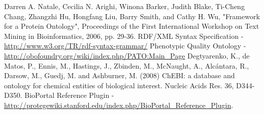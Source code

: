 \documentclass{ao2e}%
\begin{document}
\begin{thebibliography}{}
 Darren A. Natale, Cecilia N. Arighi, Winona Barker, Judith Blake, Ti-Cheng Chang, Zhangzhi Hu, Hongfang Liu, Barry Smith, and Cathy H. Wu, "Framework for a Protein Ontology", Proceedings of the First International Workshop on Text Mining in Bioinformatics, 2006, pp. 29-36.
 RDF/XML Syntax Specification - \url{http://www.w3.org/TR/rdf-syntax-grammar/}
 Phenotypic Quality Ontology - \url{http://obofoundry.org/wiki/index.php/PATO:Main_Page}
 Degtyarenko, K., de Matos, P., Ennis, M., Hastings, J., Zbinden, M., McNaught, A., Alcántara, R., Darsow, M., Guedj, M. and Ashburner, M. (2008) ChEBI: a database and ontology for chemical entities of biological interest. Nucleic Acids Res. 36, D344-D350.
 BioPortal Reference Plugin - \url{http://protegewiki.stanford.edu/index.php/BioPortal_Reference_Plugin}.

 
\end{thebibliography}





%


    
\begin{acronym}





\end{acronym}
\end{document}
